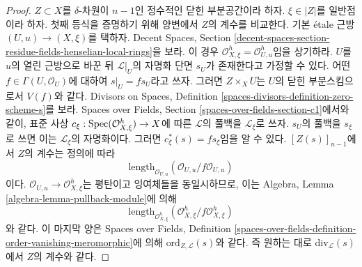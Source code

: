 \begin{proof}
$Z \subset X$를 $\delta$-차원이 $n - 1$인 정수적인 닫힌
부분공간이라 하자. $\xi \in |Z|$를 일반점이라 하자. 첫째 등식을
증명하기 위해 양변에서 $Z$의 계수를 비교한다.
기본 \'etale 근방 $(U, u) \to (X, \xi)$를 택하자. Decent Spaces,
Section
\ref{decent-spaces-section-residue-fields-henselian-local-rings}을 보라.
이 경우 $\mathcal{O}_{X, \xi}^h = \mathcal{O}_{U, u}^h$임을
상기하라. $U$를 $u$의 열린 근방으로 바꾼 뒤
$\mathcal{L}|_U$의 자명화 단면 $s_U$가 존재한다고 가정할 수 있다.
어떤 $f \in \Gamma(U, \mathcal{O}_U)$에 대하여
$s|_U = f s_U$라고 쓰자. 그러면 $Z \times_X U$는 $U$의 닫힌
부분스킴으로서 $V(f)$와 같다. Divisors on Spaces, Definition
\ref{spaces-divisors-definition-zero-scheme-s}를 보라.
Spaces over Fields, Section \ref{spaces-over-fields-section-c1}에서와
같이, 표준 사상 $c_\xi : \mathop{\mathrm{Spec}}(\mathcal{O}_{X, \xi}^h) \to X$에
따른 $\mathcal{L}$의 풀백을 $\mathcal{L}_\xi$로 쓰자.
$s_U$의 풀백을 $s_\xi$로 쓰면 이는 $\mathcal{L}_\xi$의
자명화이다. 그러면 $c_\xi^*(s) = fs_\xi$임을 알 수 있다.
$[Z(s)]_{n - 1}$에서 $Z$의 계수는 정의에 따라
$$
\text{length}_{\mathcal{O}_{U, u}}(\mathcal{O}_{U, u}/f\mathcal{O}_{U, u})
$$
이다. $\mathcal{O}_{U, u} \to \mathcal{O}_{X, \xi}^h$는
평탄이고 잉여체들을 동일시하므로, 이는 Algebra, Lemma
\ref{algebra-lemma-pullback-module}에 의해
$$
\text{length}_{\mathcal{O}_{X, \xi}^h}
(\mathcal{O}_{X, \xi}^h/f\mathcal{O}_{X, \xi}^h)
$$
와 같다. 이 마지막 양은 Spaces over Fields, Definition
\ref{spaces-over-fields-definition-order-vanishing-meromorphic}에 의해
$\text{ord}_{Z, \mathcal{L}}(s)$와 같다. 즉 원하는 대로
$\text{div}_\mathcal{L}(s)$에서 $Z$의 계수와 같다.
\end{proof}


